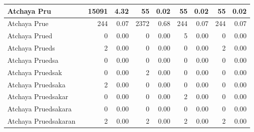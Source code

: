 \begin{table}[!htb]
\begin{center}
{\begin{tabular}{ | l | r | r | r | r | r | r | r | r | }
    \hline                   
    Atchaya Pru               & \cellcolor{green} 15091 & 4.32 & 55 & 0.02 & 55 & 0.02 & 55 & 0.02 \\
    \hline                   
    Atchaya Prue              & 244 & 0.07 & \cellcolor{green} 2372 & 0.68 & 244 & 0.07 & 244 & 0.07 \\
    \hline                   
    Atchaya Prued             & 0 & 0.00 & 0 & 0.00 & \cellcolor{green} 5 & 0.00 & 0 & 0.00 \\
    \hline                   
    Atchaya Prueds            & \cellcolor{green} 2 & 0.00 & 0 & 0.00 & 0 & 0.00 & \cellcolor{green} 2 & 0.00 \\
    \hline                   
    Atchaya Pruedsa           & 0 & 0.00 & 0 & 0.00 & 0 & 0.00 & 0 & 0.00 \\
    \hline                   
    Atchaya Pruedsak          & 0 & 0.00 & \cellcolor{green} 2 & 0.00 & 0 & 0.00 & 0 & 0.00 \\
    \hline                   
    Atchaya Pruedsaka         & \cellcolor{green} 2 & 0.00 & 0 & 0.00 & 0 & 0.00 & 0 & 0.00 \\
    \hline                   
    Atchaya Pruedsakar        & 0 & 0.00 & 0 & 0.00 & \cellcolor{green} 2 & 0.00 & 0 & 0.00 \\
    \hline                   
    Atchaya Pruedsakara       & 0 & 0.00 & 0 & 0.00 & 0 & 0.00 & 0 & 0.00 \\
    \hline                   
    Atchaya Pruedsakaran      & \cellcolor{green} 2 & 0.00 & \cellcolor{green} 2 & 0.00 & \cellcolor{green} 2 & 0.00 & \cellcolor{green} 2 & 0.00 \\
    \hline  
  \end{tabular}
}
\end{center}
\label{tableIndianName}
\end{table}


